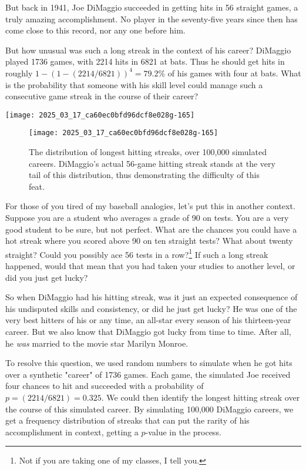 \documentclass[10pt]{article}
\begin{document}
But back in 1941, Joe DiMaggio succeeded in getting hits in 56 straight games, a truly amazing accomplishment. No player in the seventy-five years since then has come close to this record, nor any one before him.

But how unusual was such a long streak in the context of his career? DiMaggio played 1736 games, with 2214 hits in 6821 at bats. Thus he should get hits in roughly $1 - (1 - (2214 / 6821))^{4} = 79.2\%$ of his games with four at bats. What is the probability that someone with his skill level could manage such a consecutive game streak in the course of their career?

\texttt{[image: 2025\_03\_17\_ca60ec0bfd96dcf8e028g-165]}

\begin{figure}[H]
\centering
\texttt{[image: 2025\_03\_17\_ca60ec0bfd96dcf8e028g-165]}
\caption{The distribution of longest hitting streaks, over 100,000 simulated careers. DiMaggio's actual 56-game hitting streak stands at the very tail of this distribution, thus demonstrating the difficulty of this feat.}
\end{figure}

For those of you tired of my baseball analogies, let's put this in another context. Suppose you are a student who averages a grade of 90 on tests. You are a very good student to be sure, but not perfect. What are the chances you could have a hot streak where you scored above 90 on ten straight tests? What about twenty straight? Could you possibly ace 56 tests in a row?\footnote{Not if you are taking one of my classes, I tell you.} If such a long streak happened, would that mean that you had taken your studies to another level, or did you just get lucky?

So when DiMaggio had his hitting streak, was it just an expected consequence of his undisputed skills and consistency, or did he just get lucky? He was one of the very best hitters of his or any time, an all-star every season of his thirteen-year career. But we also know that DiMaggio got lucky from time to time. After all, he \textit{was} married to the movie star Marilyn Monroe.

To resolve this question, we used random numbers to simulate when he got hits over a synthetic "career" of 1736 games. Each game, the simulated Joe received four chances to hit and succeeded with a probability of $p = (2214 / 6821) = 0.325$. We could then identify the longest hitting streak over the course of this simulated career. By simulating 100,000 DiMaggio careers, we get a frequency distribution of streaks that can put the rarity of his accomplishment in context, getting a $p$-value in the process.
\end{document}
